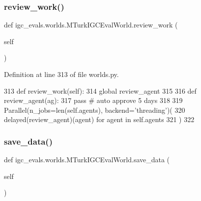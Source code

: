 \mbox{\label{classigc__evals_1_1worlds_1_1MTurkIGCEvalWorld_aa3a8ea3999f002288078223aa079d76d}} 
\subsubsection{\texorpdfstring{review\+\_\+work()}{review\_work()}}
{\footnotesize\ttfamily def igc\+\_\+evals.\+worlds.\+M\+Turk\+I\+G\+C\+Eval\+World.\+review\+\_\+work (\begin{DoxyParamCaption}\item[{}]{self }\end{DoxyParamCaption})}



Definition at line 313 of file worlds.\+py.


\begin{DoxyCode}
313     \textcolor{keyword}{def }review\_work(self):
314         \textcolor{keyword}{global} review\_agent
315 
316         \textcolor{keyword}{def }review\_agent(ag):
317             \textcolor{keywordflow}{pass}  \textcolor{comment}{# auto approve 5 days}
318 
319         Parallel(n\_jobs=len(self.agents), backend=\textcolor{stringliteral}{'threading'})(
320             delayed(review\_agent)(agent) \textcolor{keywordflow}{for} agent \textcolor{keywordflow}{in} self.agents
321         )
322 
\end{DoxyCode}
\mbox{\label{classigc__evals_1_1worlds_1_1MTurkIGCEvalWorld_a63d2d41442d28373315a58c1d70686b3}} 
\subsubsection{\texorpdfstring{save\+\_\+data()}{save\_data()}}
{\footnotesize\ttfamily def igc\+\_\+evals.\+worlds.\+M\+Turk\+I\+G\+C\+Eval\+World.\+save\+\_\+data (\begin{DoxyParamCaption}\item[{}]{self }\end{DoxyParamCaption})}



